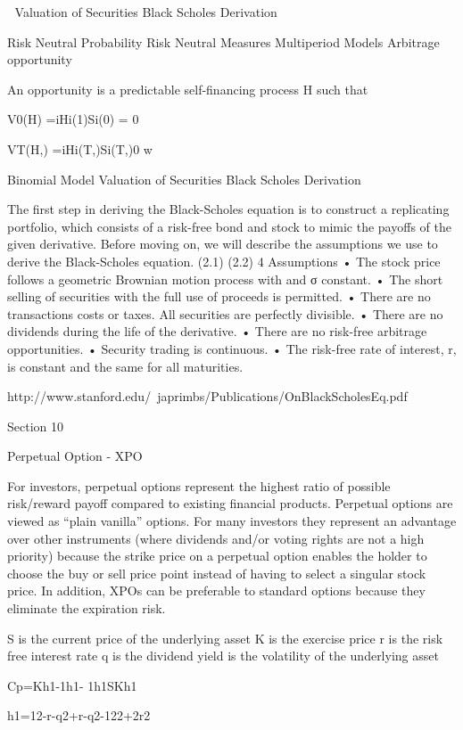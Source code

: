 

Valuation of Securities
Black Scholes Derivation

Risk Neutral Probability
Risk Neutral Measures
Multiperiod Models
Arbitrage opportunity

An opportunity is a predictable self-financing process H such that

V0(H) =iHi(1)Si(0) = 0

VT(H,) =iHi(T,)Si(T,)0		w

Binomial Model
Valuation of Securities
Black Scholes Derivation



The first step in deriving the Black-Scholes equation is to construct a replicating portfolio, which 
consists of a risk-free bond and stock to mimic the payoffs of the given derivative. Before 
moving on, we will describe the assumptions we use to derive the Black-Scholes equation. 
(2.1) 
(2.2) 4
Assumptions
• The stock price follows a geometric Brownian motion process with    and  σ constant. 
• The short selling of securities with the full use of proceeds is permitted. 
• There are no transactions costs or taxes. All securities are perfectly divisible. 
• There are no dividends during the life of the derivative. 
• There are no risk-free arbitrage opportunities. 
• Security trading is continuous. 
• The risk-free rate of interest, r, is constant and the same for all maturities.

http://www.stanford.edu/~japrimbs/Publications/OnBlackScholesEq.pdf


Section 10

Perpetual Option - XPO

For investors, perpetual options represent the highest ratio of possible risk/reward payoff compared to existing financial products. Perpetual options are viewed as “plain vanilla” options. For many investors they represent an advantage over other instruments (where dividends and/or voting rights are not a high priority) because the strike price on a perpetual option enables the holder to choose the buy or sell price point instead of having to select a singular stock price. In addition, XPOs can be preferable to standard options because they eliminate the expiration risk.

S is the current price of the underlying asset
K is the exercise price
r is the risk free interest rate
q is the dividend yield
 is the volatility of the underlying asset

Cp=Kh1-1h1- 1h1SKh1

h1=12-r-q2+r-q2-122+2r2
 
